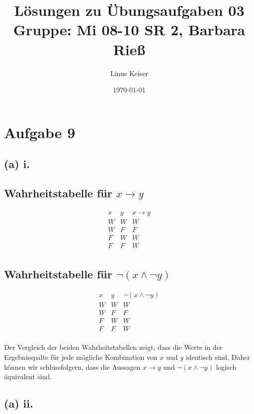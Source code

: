 \documentclass[12pt]{article}
\title{Lösungen\rlap{\raisebox{0.3ex}{\hspace{0mm}\textsuperscript{\tiny Learning}}} zu\rlap{\raisebox{-0.3ex}{\hspace{0mm}\textsubscript{\tiny \LaTeX}}} Übungsaufgaben\rlap{\raisebox{0.3ex}{\hspace{-8mm}\textsuperscript{\tiny Edition}}} 03\rlap{\textsubscript{\tiny :)}}
\\ \small Gruppe: Mi 08-10 SR 2, Barbara Rieß}
\author{Linus Keiser}
\date{\today}
\begin{document}
\maketitle

\section*{Aufgabe 9}

\subsection*{(a) i.}

\subsection*{Wahrheitstabelle für \( x \rightarrow y \)}
\[
	\begin{array}{cc|c}
		x & y & x \rightarrow y \\
		\hline
		W & W & W               \\
		W & F & F               \\
		F & W & W               \\
		F & F & W               \\
	\end{array}
\]

\subsection*{Wahrheitstabelle für \( \neg(x \land \neg y) \)}
\[
	\begin{array}{cc|c}
		x & y & \neg(x \land \neg y) \\
		\hline
		W & W & W                    \\
		W & F & F                    \\
		F & W & W                    \\
		F & F & W                    \\
	\end{array}
\]

Der Vergleich der beiden Wahrheitstabellen zeigt, dass die Werte in der Ergebnisspalte für jede mögliche Kombination von \( x \) und \( y \) identisch sind. Daher können wir schlussfolgern, dass die Aussagen \( x \rightarrow y \) und \( \neg(x \land \neg y) \) logisch äquivalent sind.

\subsection*{(a) ii.}
\end{document}

